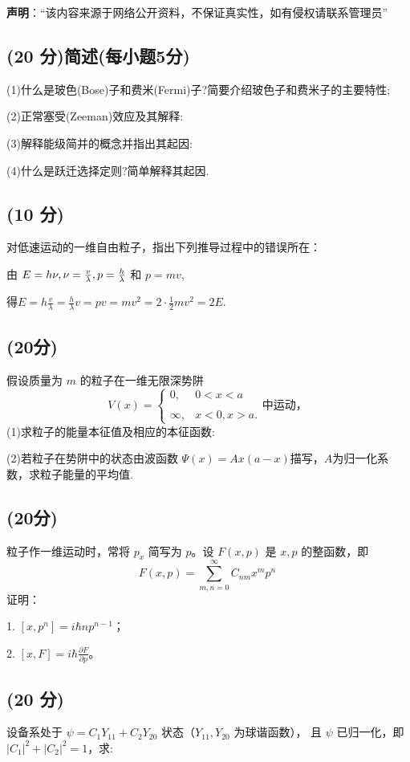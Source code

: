 
\textbf{声明}：“该内容来源于网络公开资料，不保证真实性，如有侵权请联系管理员”

\subsection{(20 分)简述(每小题5分)}
(1)什么是玻色(Bose)子和费米(Fermi)子?简要介绍玻色子和费米子的主要特性;

(2)正常塞受(Zeeman)效应及其解释:

(3)解释能级简并的概念并指出其起因:

(4)什么是跃迁选择定则?简单解释其起因.
\subsection{(10 分)}
对低速运动的一维自由粒子，指出下列推导过程中的错误所在：

由 $E = h \nu, \\ \nu = \frac{v}{\lambda}, \\ p = \frac{h}{\lambda}$ 和 $ p = mv$,

得$E = h \frac{v}{\lambda} = \frac{h}{\lambda} v = p v = mv^2 = 2 \cdot \frac{1}{2} mv^2 = 2E$.
\subsection{(20分)}
假设质量为 $m$ 的粒子在一维无限深势阱
\[V(x) = \begin{cases}    0, & 0<x<a \\\\   \infty, & x<0,x> a.    \end{cases}\text{中运动，}~\]
(1)求粒子的能量本征值及相应的本征函数:

(2)若粒子在势阱中的状态由波函数 $\Psi(x)=Ax(a-x)$描写，$A$为归一化系数，求粒子能量的平均值.
\subsection{(20分)}
粒子作一维运动时，常将 $p_x$ 简写为 $p$。设 $F(x, p)$ 是 $x, p$ 的整函数，即 
$$F(x, p) = \sum_{m,n=0}^{\infty} C_{nm} x^m p^n~$$
证明：

1. $[x, p^n] = i \hbar n p^{n-1}$；

2. $[x, F] = i \hbar \frac{\partial F}{\partial p}$。
\subsection{(20 分)}
设备系处于 $\psi = C_1 Y_{11} + C_2 Y_{20}$ 状态（$Y_{11}, Y_{20}$ 为球谐函数），
且 $\psi$ 已归一化，即 $|C_1|^2 + |C_2|^2 = 1$，求:

